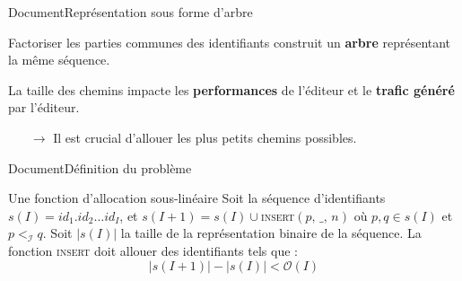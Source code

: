 \begin{frame}{Document}{Représentation sous forme d'arbre}

  \begin{center}
    
  \end{center}
  
  \vspace{0.15cm}
  
  \begin{minipage}{0.55\textwidth}
    Factoriser les parties communes des identifiants construit un \textbf{arbre}
    représentant la même séquence.

    \vspace{0.2cm}

    La taille des chemins impacte les \textbf{performances} de l'éditeur et le
    \textbf{trafic généré} par l'éditeur.
    \begin{itemize}
    \item [$\rightarrow$] Il est crucial d'allouer les plus petits chemins
      possibles.
    \end{itemize}
  \end{minipage}
  \hfill
  \begin{minipage}{0.37\textwidth}
    \begin{center}
      
    \end{center}
  \end{minipage}

\end{frame}



\begin{frame}{Document}{Définition du problème}

  \begin{block}{Une fonction d'allocation sous-linéaire}
    Soit la séquence d'identifiants $s(I)= id_1.id_2\ldots id_I$, et
    $s(I+1) = s(I) \cup $\textsc{insert}$(p,\, \_,\, n)$ où $p,q \in s(I)$ et
    $p<_\mathcal{I}q$. Soit $|s(I)|$ la taille de la représentation binaire de la
    séquence. La fonction \textsc{insert} doit allouer des identifiants tels que :
    \begin{equation}
      |s(I+1)| - |s(I)| < \mathcal{O}(I)
    \end{equation}
  \end{block}
  


\end{frame}


